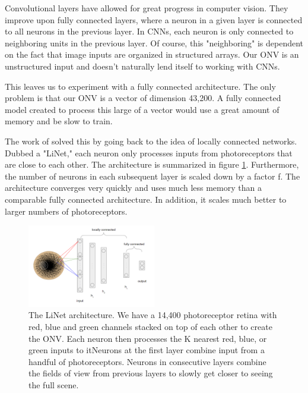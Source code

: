 \documentclass[../taasin.tex]{subfiles}
\begin{document}
\label{appendix:linet}



Convolutional layers have allowed for great progress in computer vision. They improve upon fully
connected layers, where a neuron in a given layer is connected to all neurons in the previous layer. In CNNs, each neuron is only connected to neighboring units in the previous layer. Of course, this "neighboring" is dependent on the fact that image inputs are organized in structured arrays. Our ONV is an unstructured input and doesn't naturally lend itself to working with CNNs.

This leaves us to experiment with a fully connected architecture. The only problem is that our ONV is a vector of dimension 43,200. A fully connected model created to process this large of a vector would use a great amount of memory and be slow to train. 

The work of \cite{Masaki} solved this by going back to the idea of locally connected networks. Dubbed a "LiNet," each neuron only processes inputs from photoreceptors that are close to each other. The architecture is summarized in figure \ref{fig:linet_rgb}. Furthermore, the number of neurons in each subsequent layer is scaled down by a factor f. The architecture converges very quickly and uses much less memory than a comparable fully connected architecture. In addition, it scales much better to larger numbers of photoreceptors.

\begin{figure}[h]
    \centering
    \includegraphics[width=0.5\textwidth]{figures/linet_summary.pdf}
    \caption{The LiNet architecture. We have a 14,400 photoreceptor retina with red, blue and green channels stacked on top of each other to create the ONV. Each neuron then processes the K nearest red, blue, or green inputs to itNeurons at the first layer combine input from a handful of photoreceptors. Neurons in consecutive layers combine the fields of view from previous layers to slowly get closer to seeing the full scene.}
    \label{fig:linet_rgb}
\end{figure}
\end{document}

